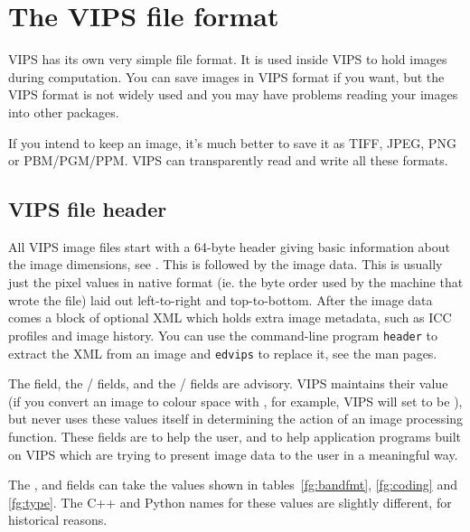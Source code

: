 \section{The VIPS file format}

VIPS has its own very simple file format. It is used inside VIPS to hold
images during computation. You can save images in VIPS format if you want,
but the VIPS format is not widely used and you may have problems reading
your images into other packages.

If you intend to keep an image, it's much better to save it as TIFF, 
JPEG, PNG or PBM/PGM/PPM. VIPS can transparently read and write all these
formats.

\subsection{VIPS file header}
\label{sec:header}

All VIPS image files start with a 64-byte header giving basic information
about the image dimensions, see . This is followed by the 
image data. This is usually just the pixel values in native format (ie. the
byte order used by the machine that wrote the file) laid out left-to-right and
top-to-bottom. After the image data comes a block of optional XML which holds
extra image metadata, such as ICC profiles and image history.
You can use the command-line program \verb+header+ to extract the XML from an
image and \verb+edvips+ to replace it, see the man pages.

The  field, the / fields, and the
/ fields are advisory. VIPS maintains their value
(if you convert an image to \cielab{} colour space with ,
for example, VIPS will set  to be ), but never
uses these values itself in determining the action of an image processing
function. These fields are to help the user, and to help application
programs built on VIPS which are trying to present image data to the user
in a meaningful way.

The ,  and  fields can take the values
shown in tables~\ref{fg:bandfmt}, \ref{fg:coding} and \ref{fg:type}. The C++
and Python names for these values are slightly different, for historical
reasons.

